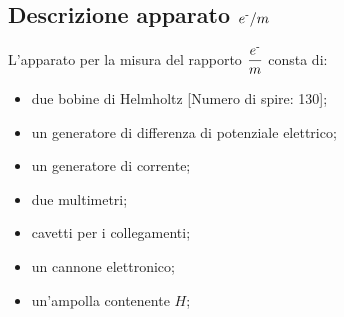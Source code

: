 \subsection{Descrizione apparato $e^{\textrm{-}}/m$}
L'apparato per la misura del rapporto $\dfrac{e^{\textrm{-}}}{m}$ consta di:
\begin{itemize}
\item due bobine di Helmholtz [Numero di spire: 130];
\item un generatore di differenza di potenziale elettrico;
\item un generatore di corrente;
\item due multimetri;
\item cavetti per i collegamenti;
\item un cannone elettronico;
\item un'ampolla contenente $H$;

\end{itemize}
